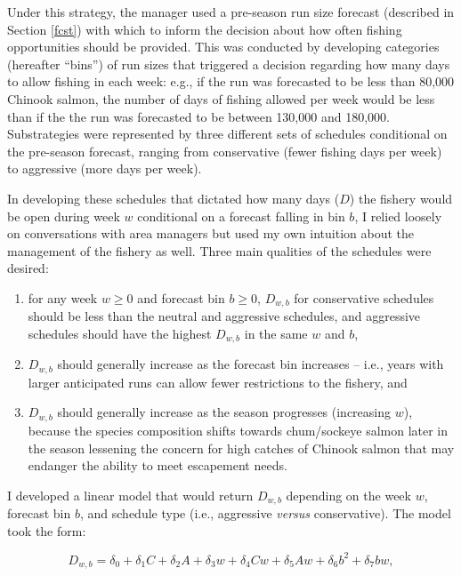 \documentclass[12pt,]{book}
\theoremstyle{definition}
\theoremstyle{definition}
\theoremstyle{definition}
\theoremstyle{remark}
\begin{document}
\noindent
Under this strategy, the manager used a pre-season run size forecast
(described in Section \ref{fcst}) with which to inform the decision
about how often fishing opportunities should be provided. This was
conducted by developing categories (hereafter ``bins'') of run sizes
that triggered a decision regarding how many days to allow fishing in
each week: e.g., if the run was forecasted to be less than 80,000
Chinook salmon, the number of days of fishing allowed per week would be
less than if the the run was forecasted to be between 130,000 and
180,000. Substrategies were represented by three different sets of
schedules conditional on the pre-season forecast, ranging from
conservative (fewer fishing days per week) to aggressive (more days per
week).

In developing these schedules that dictated how many days (\(D\)) the
fishery would be open during week \(w\) conditional on a forecast
falling in bin \(b\), I relied loosely on conversations with area
managers but used my own intuition about the management of the fishery
as well. Three main qualities of the schedules were desired:

\begin{enumerate}
\def\labelenumi{(\arabic{enumi})}
\item
  for any week \(w \ge 0\) and forecast bin \(b \ge 0\), \(D_{w,b}\) for
  conservative schedules should be less than the neutral and aggressive
  schedules, and aggressive schedules should have the highest
  \(D_{w,b}\) in the same \(w\) and \(b\),
\item
  \(D_{w,b}\) should generally increase as the forecast bin increases --
  i.e., years with larger anticipated runs can allow fewer restrictions
  to the fishery, and
\item
  \(D_{w,b}\) should generally increase as the season progresses
  (increasing \(w\)), because the species composition shifts towards
  chum/sockeye salmon later in the season lessening the concern for high
  catches of Chinook salmon that may endanger the ability to meet
  escapement needs.
\end{enumerate}

\noindent
I developed a linear model that would return \(D_{w,b}\) depending on
the week \(w\), forecast bin \(b\), and schedule type (i.e., aggressive
\emph{versus} conservative). The model took the form:

\begin{equation}
  D_{w,b} = \delta_0 + \delta_1C + \delta_2A + \delta_3 w + \delta_4 Cw + \delta_5 Aw + \delta_6 b^2 + \delta_7 bw,
  \label{eq:gen-ms2-schedule}
\end{equation}
\end{document}
